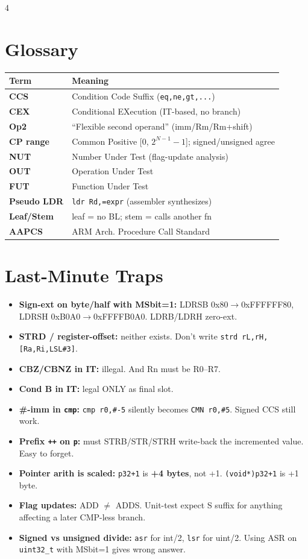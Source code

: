 \documentclass[8pt,landscape]{extarticle}
\newcommand{\asm}[1]{\texttt{\scriptsize #1}}
\newcommand{\cee}[1]{\texttt{\scriptsize #1}}
\begin{document}
\begin{multicols*}{4}
\section{Glossary}
\begin{tabular}{@{}ll@{}}
\toprule
Term & Meaning \\
\midrule
\textbf{CCS}   & Condition Code Suffix (\texttt{eq,ne,gt,...}) \\
\textbf{CEX}   & Conditional EXecution (IT-based, no branch) \\
\textbf{Op2}   & ``Flexible second operand'' (imm/Rm/Rm+shift) \\
\textbf{CP range} & Common Positive [0, $2^{N-1}-1$]; signed/unsigned agree \\
\textbf{NUT}   & Number Under Test (flag-update analysis) \\
\textbf{OUT}   & Operation Under Test \\
\textbf{FUT}   & Function Under Test \\
\textbf{Pseudo LDR} & \asm{ldr Rd,=expr} (assembler synthesizes) \\
\textbf{Leaf/Stem} & leaf = no BL; stem = calls another fn \\
\textbf{AAPCS} & ARM Arch. Procedure Call Standard \\
\bottomrule
\end{tabular}

\section{Last-Minute Traps}
\begin{itemize}
\item \textbf{Sign-ext on byte/half with MSbit=1:} LDRSB 0x80$\to$0xFFFFFF80, LDRSH 0xB0A0$\to$0xFFFFB0A0. LDRB/LDRH zero-ext.
\item \textbf{STRD / register-offset:} neither exists. Don't write \asm{strd rL,rH,[Ra,Ri,LSL\#3]}.
\item \textbf{CBZ/CBNZ in IT:} illegal. And Rn must be R0--R7.
\item \textbf{Cond B in IT:} legal ONLY as final slot.
\item \textbf{\#-imm in \asm{cmp}:} \asm{cmp r0,\#-5} silently becomes \asm{CMN r0,\#5}. Signed CCS still work.
\item \textbf{Prefix \texttt{++} on \cee{*p}:} must STRB/STR/STRH write-back the incremented value. Easy to forget.
\item \textbf{Pointer arith is scaled:} \cee{p32+1} is \textbf{+4 bytes}, not +1. \cee{(void*)p32+1} is +1 byte.
\item \textbf{Flag updates:} ADD $\ne$ ADDS. Unit-test expect S suffix for anything affecting a later CMP-less branch.
\item \textbf{Signed vs unsigned divide:} \asm{asr} for int/2, \asm{lsr} for uint/2. Using ASR on \cee{uint32\_t} with MSbit=1 gives wrong answer.
\end{itemize}

\end{multicols*}
\end{document}
